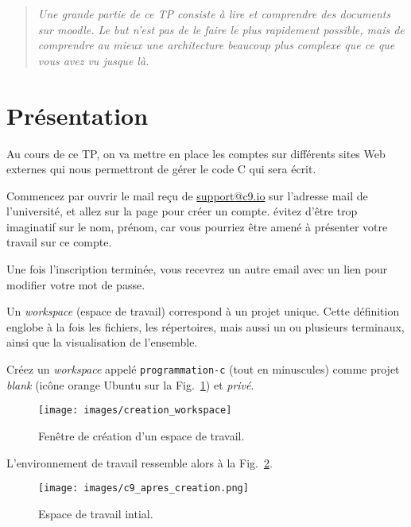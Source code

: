 \titre{\tgit}

\begin{quotation}
  \sl Une grande partie de ce TP consiste à lire et comprendre des
  documents sur moodle. Le but n'est pas de le faire le plus
  rapidement possible, mais de comprendre au mieux une architecture
  beaucoup plus complexe que ce que vous avez vu jusque là.
\end{quotation}

\section*{Présentation}

Au cours de ce TP, on va mettre en place les comptes sur différents
sites Web externes qui nous permettront de gérer le code C qui sera
écrit.


\question Commencez par ouvrir le mail reçu de \url{support@c9.io} sur
l'adresse mail de l'université, et allez sur la page pour créer un
compte. évitez d'être trop imaginatif sur le nom, prénom, car vous
pourriez être amené à présenter votre travail sur ce compte.

\question Une fois l'inscription terminée, vous recevrez un autre
email avec un lien pour modifier votre mot de passe.

Un \emph{workspace} (espace de travail) correspond à un projet
unique. Cette définition englobe à la fois les fichiers, les
répertoires, mais aussi un ou plusieurs terminaux, ainsi que la
visualisation de l'ensemble. 

\question Créez un \emph{workspace} appelé \texttt{programmation-c} (tout
en minuscules) comme projet \emph{blank} (icône orange Ubuntu
sur la Fig.~\ref{fig:workspace:creation}) et \emph{privé}.

\begin{figure}[htbp]
  \centering
  \texttt{[image: images/creation\_workspace]}
  \caption{Fenêtre de création d'un espace de travail.}
  \label{fig:workspace:creation}
\end{figure}

L'environnement de travail ressemble alors à la Fig.~\ref{fig:workspace:initial}.

\begin{figure}[htbp]
  \centering
  \texttt{[image: images/c9\_apres\_creation.png]}
  \caption{Espace de travail intial.}
  \label{fig:workspace:initial}
\end{figure}

